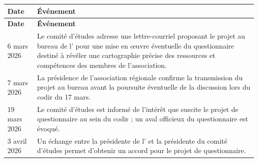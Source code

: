 \begingroup
\StyledTableSetup
\begin{xltabular}{\linewidth}{@{}p{2.6cm}Y@{}}
\toprule
\textbf{Date} & \textbf{Événement} \\
\midrule
\endfirsthead
\toprule
\textbf{Date} & \textbf{Événement} \\
\midrule
\endhead
\bottomrule
\endlastfoot

6 mars 2026 &
Le comité d'études adresse une lettre-courriel proposant le projet au bureau de l'\ARSeize{} pour une mise en œuvre éventuelle du questionnaire destiné à révéler une cartographie précise des ressources et compétences des membres de l'association\footnotemark[\noteLettreCODIRDecision]. \\
\addlinespace

7 mars 2026 &
La présidence de l'association régionale confirme la transmission du projet au bureau avant la poursuite éventuelle de la discussion lors du \acrshort{codir} du 17 mars. \\
\addlinespace

19 mars 2026 &
Le comité d'études est informé de l'intérêt que suscite le projet de questionnaire au sein du \acrshort{codir} ; un aval officieux du questionnaire est évoqué. \\
\addlinespace

3 avril 2026 &
Un échange entre la présidente de l'\ARSeize{} et la présidente du comité d'études permet d'obtenir un accord pour le projet de questionnaire. \\

\end{xltabular}
\endgroup
{}
\label{tab:decision_politique_questionnaire}

\endgroup
